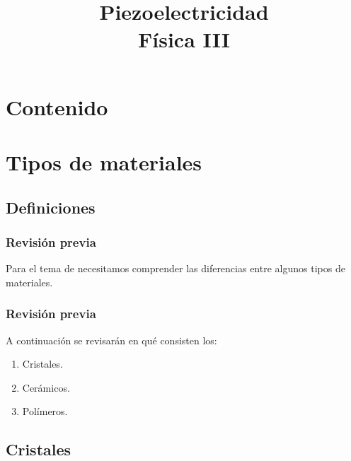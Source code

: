 \documentclass[14pt]{beamer}
\title{\Large{Piezoelectricidad} \\ \normalsize{Física III}}
\date{}
\begin{document}
\maketitle

\section*{Contenido}

\section{Tipos de materiales}
\subsection{Definiciones}

\begin{frame}
\frametitle{Revisión previa}
Para el tema de  necesitamos comprender las diferencias entre algunos tipos de materiales.
\end{frame}
\begin{frame}
\frametitle{Revisión previa}
A continuación se revisarán en qué consisten los:
\begin{enumerate}[<+->]
\item Cristales.
\item Cerámicos.
\item Polímeros.
\end{enumerate}
\end{frame}

\subsection{Cristales}
\end{document}
